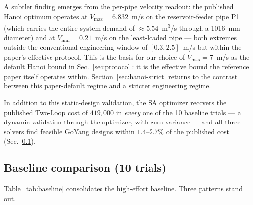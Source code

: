 \documentclass[conference]{IEEEtran}
\begin{document}
A subtler finding emerges from the per-pipe velocity readout: the published Hanoi optimum operates at $V_{\max}=6.832$~m/s on the reservoir-feeder pipe P1 (which carries the entire system demand of $\approx 5.54$~m\textsuperscript{3}/s through a 1016~mm diameter) and at $V_{\min}=0.21$~m/s on the least-loaded pipe --- both extremes outside the conventional engineering window of $[0.3, 2.5]$~m/s but within the paper's effective protocol. This is the basis for our choice of $V_{\max}=7$~m/s as the default Hanoi bound in Sec.~\ref{sec:protocol}: it is the effective bound the reference paper itself operates within. Section~\ref{sec:hanoi-strict} returns to the contrast between this paper-default regime and a stricter engineering regime.

In addition to this static-design validation, the SA optimizer recovers the published Two-Loop cost of $419{,}000$ in \emph{every} one of the 10 baseline trials --- a dynamic validation through the optimizer, with zero variance --- and all three solvers find feasible GoYang designs within $1.4$--$2.7\%$ of the published cost (Sec.~\ref{sec:baseline}).

\subsection{Baseline comparison (10 trials)}
\label{sec:baseline}
Table~\ref{tab:baseline} consolidates the high-effort baseline. Three patterns stand out.
\end{document}
